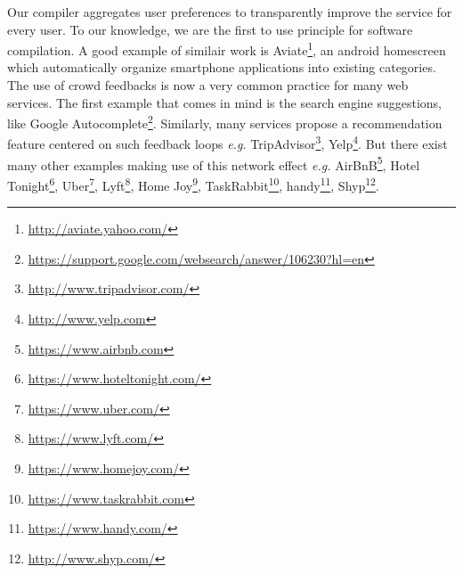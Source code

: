 Our compiler aggregates user preferences to transparently improve the service for every user.
To our knowledge, we are the first to use principle for software compilation.
A good example of similair work is Aviate\footnote{\url{http://aviate.yahoo.com/}}, an android homescreen which automatically organize smartphone applications into existing categories.
The use of crowd feedbacks is now a very common practice for many web services.
The first example that comes in mind is the search engine suggestions, like Google Autocomplete\footnote{\url{https://support.google.com/websearch/answer/106230?hl=en}}.
Similarly, many services propose a recommendation feature centered on such feedback loops \textit{e.g.} TripAdvisor\footnote{\url{http://www.tripadvisor.com/}}, Yelp\footnote{\url{http://www.yelp.com}}.
But there exist many other examples making use of this network effect \textit{e.g.}
AirBnB\footnote{\url{https://www.airbnb.com}},
Hotel Tonight\footnote{\url{https://www.hoteltonight.com/}},
Uber\footnote{\url{https://www.uber.com/}},
Lyft\footnote{\url{https://www.lyft.com/}},
Home Joy\footnote{\url{https://www.homejoy.com/}},
TaskRabbit\footnote{\url{https://www.taskrabbit.com}},
handy\footnote{\url{https://www.handy.com/}},
Shyp\footnote{\url{http://www.shyp.com/}}.